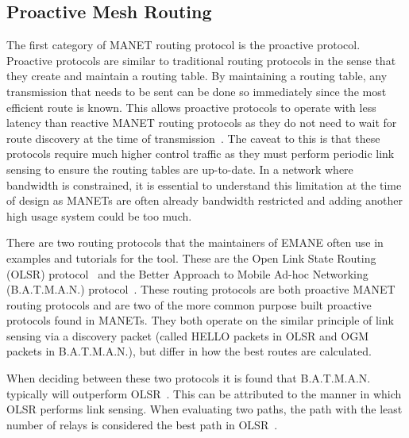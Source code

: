 \subsection{Proactive Mesh Routing}
The first category of MANET routing protocol is the proactive protocol.
Proactive protocols are similar to traditional routing protocols in the sense that they create and maintain a routing table.
By maintaining a routing table, any transmission that needs to be sent can be done so immediately since the most efficient route is known.
This allows proactive protocols to operate with less latency than reactive MANET routing protocols as they do not need to wait for route discovery at the time of transmission~\cite{manet_performance}.
The caveat to this is that these protocols require much higher control traffic as they must perform periodic link sensing to ensure the routing tables are up-to-date.
In a network where bandwidth is constrained, it is essential to understand this limitation at the time of design as MANETs are often already bandwidth restricted and adding another high usage system could be too much. \par
There are two routing protocols that the maintainers of EMANE often use in examples and tutorials for the tool.
These are the Open Link State Routing (OLSR) protocol~\cite{rfc_olsr} and the Better Approach to Mobile Ad-hoc Networking (B.A.T.M.A.N.) protocol~\cite{batman}. 
These routing protocols are both proactive MANET routing protocols and are two of the more common purpose built proactive protocols found in MANETs.
They both operate on the similar principle of link sensing via a discovery packet (called HELLO packets in OLSR and OGM packets in B.A.T.M.A.N.), but differ in how the best routes are calculated. \par
When deciding between these two protocols it is found that B.A.T.M.A.N. typically will outperform OLSR~\cite{olsrd_batman}.
This can be attributed to the manner in which OLSR performs link sensing.
When evaluating two paths, the path with the least number of relays is considered the best path in OLSR~\cite{rfc_olsr}.
